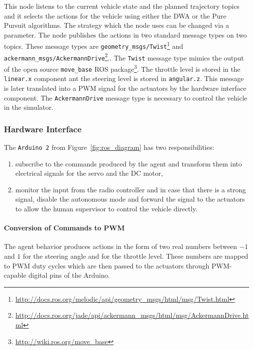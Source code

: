 This node listens to the current vehicle state and the planned trajectory topics and it selects the actions for the vehicle using either the \gls{DWA} or the Pure Pursuit algorithms. The strategy which the node uses can be changed via a parameter. The node publishes the actions in two standard message types on two topics. These message types are \verb|geometry_msgs/Twist|\footnote{\url{http://docs.ros.org/melodic/api/geometry\_msgs/html/msg/Twist.html}} and \texttt{ackermann\_msgs/\-AckermannDrive}\footnote{\url{http://docs.ros.org/jade/api/ackermann_msgs/html/msg/AckermannDrive.html}}.. The \texttt{Twist} message type mimics the output of the open source \verb|move_base| \gls*{ROS} package\footnote{\url{http://wiki.ros.org/move\_base}}. The throttle level is stored in the \verb|linear.x| component ant the steering level is stored in \verb|angular.z|. This message is later translated into a \gls*{PWM} signal for the actuators by the hardware interface component. The \texttt{AckermannDrive} message type is necessary to control the vehicle in the simulator.

\subsubsection{Hardware Interface}
\label{sec:hardware-interface}

The \verb|Arduino 2| from Figure~\ref{fig:ros_diagram} has two responsibilities:

\begin{enumerate}[label=(\roman*)]
	\item subscribe to the commands produced by the agent and transform them into electrical signals for the servo and the \gls*{DC} motor,
	\item monitor the input from the radio controller and in case that there is a strong signal, disable the autonomous mode and forward the signal to the actuators to allow the human supervisor to control the vehicle directly.
\end{enumerate}

\paragraph{Conversion of Commands to PWM}

The agent behavior produces actions in the form of two real numbers between $-1$ and $1$ for the steering angle and for the throttle level. These numbers are mapped to \gls*{PWM} duty cycles which are then passed to the actuators through PWM-capable digital pins of the Arduino.

